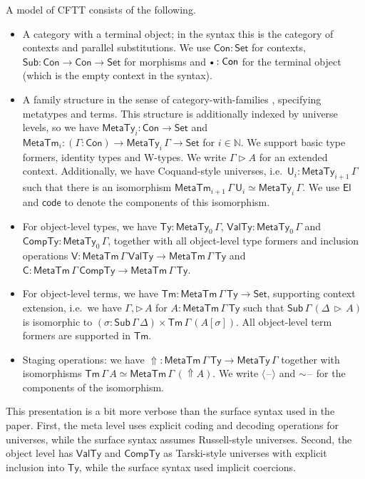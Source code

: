 \documentclass[acmsmall,screen,review,anonymous]{acmart}
\newcommand{\msf}[1]{{\mathsf{#1}}}
\newcommand{\mbb}[1]{\mathbb{#1}}
\newcommand{\U}{\mathsf{U}}
\newcommand{\code}{\mathsf{code}}
\newcommand{\bs}[1]{\boldsymbol{#1}}
\newcommand{\emptycon}{\scaleobj{.75}\bullet}
\newcommand{\El}{\msf{El}}
\newcommand{\Set}{\msf{Set}}
\newcommand{\Con}{\msf{Con}}
\newcommand{\Sub}{\msf{Sub}}
\newcommand{\Tm}{\msf{Tm}}
\newcommand{\ext}{\triangleright}
\newcommand{\Lift}{{\Uparrow}}
\newcommand{\spl}{{\bs{\sim}}}
\newcommand{\ql}{{\bs{\langle}}}
\newcommand{\qr}{{\bs{\rangle}}}
\newcommand{\MTy}{\msf{MetaTy}}
\newcommand{\MTm}{\msf{MetaTm}}
\newcommand{\VTy}{\msf{ValTy}}
\newcommand{\Ty}{\msf{Ty}}
\newcommand{\CTy}{\msf{CompTy}}
\newcommand{\blank}{{\mathord{\hspace{1pt}\text{--}\hspace{1pt}}}}
\theoremstyle{remark}
\begin{document}
\begin{definition}[] A model of CFTT consists of the following.

\begin{itemize}
\item A category with a terminal object; in the syntax this is the category
  of contexts and parallel substitutions. We use $\Con : \Set$ for contexts,
  $\Sub : \Con \to \Con \to \Set$ for morphisms and $\emptycon : \Con$ for the
  terminal object (which is the empty context in the syntax).
\item A family structure in the sense of category-with-families \cite{TODO},
  specifying metatypes and terms. This structure is additionally indexed by
  universe levels, so we have $\MTy_i : \Con \to \Set$ and $\msf{MetaTm}_i :
  (\Gamma : \Con) \to \MTy_i\,\Gamma \to \Set$ for $i \in \mbb{N}$. We support
  basic type formers, identity types and W-types. We write $\Gamma \ext A$ for
  an extended context. Additionally, we have Coquand-style universes,
  i.e.\ $\U_i : \MTy_{i+1}\,\Gamma$ such that there is an isomorphism
  $\msf{MetaTm}_{i+1}\,\Gamma\,\U_i \simeq \MTy_i\,\Gamma$.  We use $\El$ and
  $\code$ to denote the components of this isomorphism.
\item
  For object-level types, we have $\Ty : \MTy_0\,\Gamma$, $\VTy :
  \MTy_0\,\Gamma$ and $\CTy : \MTy_0\,\Gamma$, together with all object-level
  type formers and inclusion operations $\msf{V} : \MTm\,\Gamma\,\VTy \to \MTm\,\Gamma\,\Ty$
  and $\msf{C} : \MTm\,\Gamma\,\CTy \to \MTm\,\Gamma\,\Ty$.
\item For object-level terms, we have $\Tm : \MTm\,\Gamma\,\Ty \to \Set$,
  supporting context extension, i.e.\ we have $\Gamma,\ext\,A$ for
  $A : \MTm\,\Gamma\,\Ty$ such that $\Sub\,\Gamma\,(\Delta\,\ext\,A)$ is isomorphic
  to $(\sigma : \Sub\,\Gamma\,\Delta) \times \Tm\,\Gamma\,(A[\sigma])$. All
  object-level term formers are supported in $\Tm$.
\item Staging operations: we have $\Lift : \MTm\,\Gamma\,\Ty \to \MTy\,\Gamma$ together
  with isomorphisms $\Tm\,\Gamma\,A \simeq \MTm\,\Gamma\,(\Lift A)$.
  We write $\ql\!\blank\!\qr$ and $\spl\!\blank$ for the components of the isomorphism.
\end{itemize}
\end{definition}
This presentation is a bit more verbose than the surface syntax used in the
paper. First, the meta level uses explicit coding and decoding operations for
universes, while the surface syntax assumes Russell-style universes. Second, the
object level has $\VTy$ and $\CTy$ as Tarski-style universes with explicit
inclusion into $\Ty$, while the surface syntax used implicit coercions.
\end{document}
